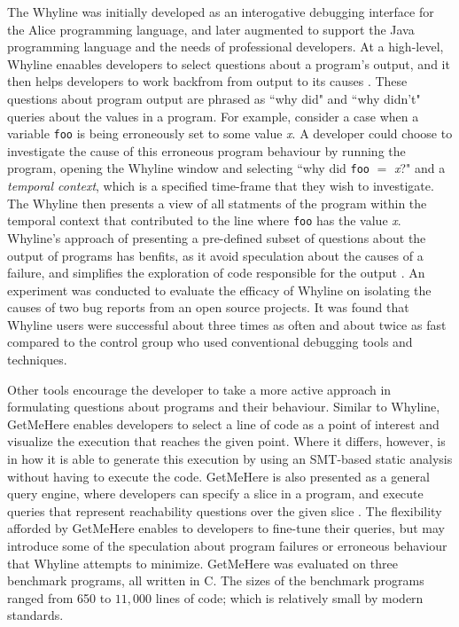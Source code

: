 \par The Whyline was initially developed as an interogative debugging interface
for the Alice programming language, and later augmented to support the Java
programming language and the needs of professional developers.
At a high-level, Whyline enaables developers to select questions about a
program's output, and it then helps developers to work backfrom from output
to its causes \cite{ko-2009-java-whyline}.
These questions about program output are phrased as ``why did" and ``why didn't"
queries about the values in a program. 
For example, consider a case when a variable \texttt{foo} is being erroneously 
set to some value \textit{x}.
A developer could choose to investigate the cause of this erroneous program
behaviour by running the program, opening the Whyline window and selecting
``why did \texttt{foo} $=$ \textit{x}?" and a \emph{temporal context}, which is 
 a specified time-frame that they wish to investigate.
The Whyline then presents a view of all statments of the program within the
temporal context that contributed to the line where \texttt{foo} has the value
\textit{x}. 
Whyline's approach of presenting a pre-defined subset of questions about the 
output of programs has benfits, as it avoid speculation about the causes of
a failure, and simplifies the exploration of code responsible for the output
\cite{ko-2009-java-whyline}.
An experiment was conducted to evaluate the efficacy of Whyline on isolating the
causes of two bug reports from an open source projects.
It was found that Whyline users were successful about three times as often
and about twice as fast compared to the control group who used conventional
debugging tools and techniques.

\par Other tools encourage the developer to take a more active approach in
formulating questions about programs and their behaviour.
Similar to Whyline, GetMeHere enables developers to select a line of code as a
point of interest and visualize the execution that reaches the given point.
Where it differs, however, is in how it is able to generate this execution
by using an SMT-based static analysis \cite{barnett-2014-get} without having to
execute the code.
GetMeHere is also presented as a general query engine, where developers can
specify a slice in a program, and execute queries that represent reachability
questions over the given slice \cite{barnett-2014-get}.
The flexibility afforded by GetMeHere enables to developers to fine-tune their
queries, but may introduce some of the speculation about program failures or
erroneous behaviour that Whyline attempts to minimize.
GetMeHere was evaluated on three benchmark programs, all written in C\myhash.
The sizes of the benchmark programs ranged from 650 to $11,000$ lines of code;
which is relatively small by modern standards.

